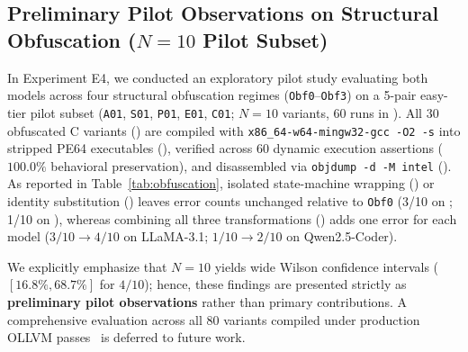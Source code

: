 \documentclass[runningheads]{llncs}
\begin{document}
\subsection{Preliminary Pilot Observations on Structural Obfuscation ($N=10$ Pilot Subset)}
\label{sec:rq4}
In Experiment E4, we conducted an exploratory pilot study evaluating both models across four structural obfuscation regimes (\texttt{Obf0}--\texttt{Obf3}) on a 5-pair easy-tier pilot subset (\texttt{A01}, \texttt{S01}, \texttt{P01}, \texttt{E01}, \texttt{C01}; $N=10$ variants, 60 runs in ). All 30 obfuscated C variants () are compiled with \texttt{x86\_64-w64-mingw32-gcc -O2 -s} into stripped PE64 executables (), verified across 60 dynamic execution assertions ($100.0\%$ behavioral preservation), and disassembled via \texttt{objdump -d -M intel} (). As reported in Table~\ref{tab:obfuscation}, isolated state-machine wrapping () or identity substitution () leaves error counts unchanged relative to \texttt{Obf0} (3/10 on ; 1/10 on ), whereas combining all three transformations () adds one error for each model ($3/10 \rightarrow 4/10$ on LLaMA-3.1; $1/10 \rightarrow 2/10$ on Qwen2.5-Coder).

We explicitly emphasize that $N=10$ yields wide Wilson confidence intervals ($[16.8\%, 68.7\%]$ for $4/10$); hence, these findings are presented strictly as \textbf{preliminary pilot observations} rather than primary contributions. A comprehensive evaluation across all 80 variants compiled under production OLLVM passes~\cite{junod2015ollvm} is deferred to future work.
\end{document}
